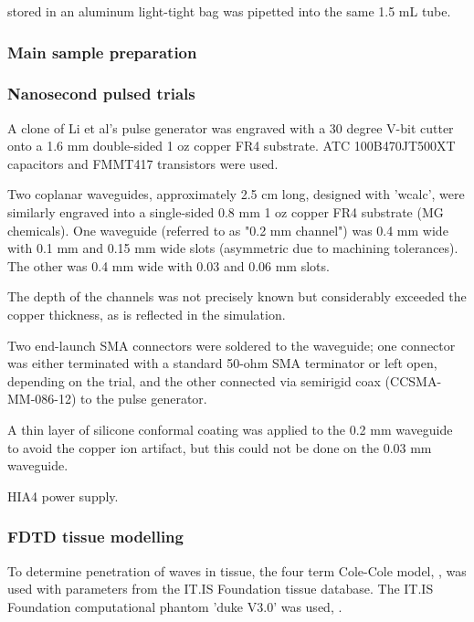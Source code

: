 \documentclass[paper.tex]{subfiles}
\begin{document}
\begin{multicols}{1}
 stored in an aluminum light-tight bag was pipetted into the same 1.5 mL tube.

\subsubsection{Main sample preparation}

\subsubsection{Nanosecond pulsed trials}

A clone of Li et al's pulse generator was engraved with a 30 degree V-bit cutter onto a 1.6 mm double-sided 1 oz copper FR4 substrate. ATC 100B470JT500XT capacitors and FMMT417 transistors were used.

Two coplanar waveguides, approximately 2.5 cm long, designed with 'wcalc'\cite{Wcalc}, were similarly engraved into a single-sided 0.8 mm 1 oz copper FR4 substrate (MG chemicals). One waveguide (referred to as "0.2 mm channel") was 0.4 mm wide with 0.1 mm and 0.15 mm wide slots (asymmetric due to machining tolerances). The other was 0.4 mm wide with 0.03 and 0.06 mm slots. 

The depth of the channels was not precisely known but considerably exceeded the copper thickness, as is reflected in the simulation.

Two end-launch SMA connectors were soldered to the waveguide; one connector was either terminated with a standard 50-ohm SMA terminator or left open, depending on the trial, and the other connected via semirigid coax (CCSMA-MM-086-12) to the pulse generator.

\conclusiongrad 

A thin layer of silicone conformal coating was applied to the 0.2 mm waveguide to avoid the copper ion artifact, but this could not be done on the 0.03 mm waveguide.

HIA4 power supply.





\subsubsection{FDTD tissue modelling}

To determine penetration of waves in tissue, the four term Cole-Cole model\cite{gabriel1996compilation}, , was used with parameters from the IT.IS Foundation tissue database\cite{Tissue2018a}. The IT.IS Foundation computational phantom 'duke V3.0' was used, \cite{Duke2014}.



\end{multicols}
\end{document}
